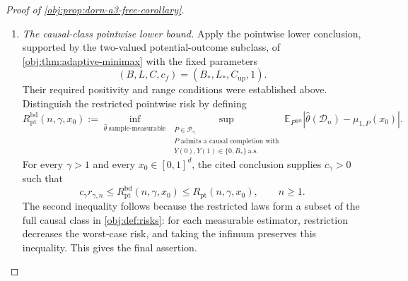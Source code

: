 \documentclass[11pt]{article}
\begin{document}
\begin{proof}[Proof of \cref{obj:prop:dorn-a3-free-corollary}]
\begin{enumerate}
\item \emph{The causal-class pointwise lower bound.}
Apply the pointwise lower conclusion, supported by the two-valued potential-outcome subclass, of
\cref{obj:thm:adaptive-minimax} with the fixed parameters
\[
(B,L,C,c_f)=(B_*,L_*,C_{\mathrm{up}},1).
\]
Their required positivity and range conditions were established above. Distinguish the restricted pointwise risk by defining
\[
R_{\mathrm{pt}}^{\mathrm{bd}}(n,\gamma,x_0)
:=
\inf_{\widehat\theta\ \mathrm{sample\text{-}measurable}}
\sup_{\substack{P\in\mathcal P_\gamma\\
P\text{ admits a causal completion with}\\
Y(0),Y(1)\in\{0,B_*\}\ \text{a.s.}}}
\mathbb E_{P^{\otimes n}}
\left|\widehat\theta(\mathcal D_n)-\mu_{1,P}(x_0)\right|.
\]
For every \(\gamma>1\) and every \(x_0\in[0,1]^d\), the cited conclusion supplies \(c_\gamma>0\) such that
\[
c_\gamma r_{\gamma,n}
\le R_{\mathrm{pt}}^{\mathrm{bd}}(n,\gamma,x_0)
\le R_{\mathrm{pt}}(n,\gamma,x_0),
\qquad n\ge1.
\]
The second inequality follows because the restricted laws form a subset of the full causal class in \cref{obj:def:risks}: for each measurable estimator, restriction decreases the worst-case risk, and taking the infimum preserves this inequality. This gives the final assertion.
\end{enumerate}
\end{proof}
\end{document}
